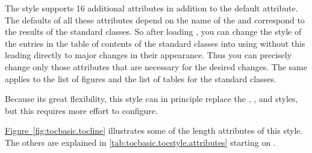 \begin{description}
  The style supports 16 additional attributes
  in addition to the default  attribute. The defaults of all
  these attributes depend on the name of the  and
  correspond to the results of the standard classes. So after loading
  , you can change the style of the entries in the table of
  contents of the standard classes into  using
   without this leading directly
  to major changes in their appearance. Thus you can precisely change only
  those attributes that are necessary for the desired changes. The same
  applies to the list of figures and the list of tables for the standard
  classes.

  Because its great flexibility, this style can in principle replace the
  , , and 
  styles, but this requires more effort to configure.

  \hyperref[fig:tocbasic.tocline]%
  {Figure~\ref*{fig:tocbasic.tocline}} illustrates some of the length
  attributes of this style. The others are explained in
  \autoref{tab:tocbasic.tocstyle.attributes} starting on
  .
  \begin{figure}
    \centering
\end{figure}
\end{description}
